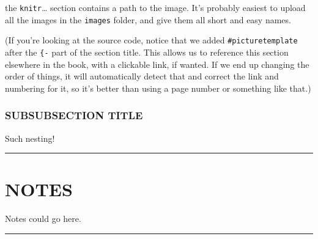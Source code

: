 \documentclass[
]{book}
\begin{document}
the \texttt{knitr}\ldots{} section contains a path to the image.
It's probably easiest to upload all the images in the \texttt{images} folder,
and give them all short and easy names.

(If you're looking at the source code, notice that we added \texttt{\#picturetemplate} after the \texttt{\{-} part of the section title.
This allows us to reference this section elsewhere in the book, with a clickable link, if wanted.
If we end up changing the order of things, it will automatically detect that and correct the link and numbering for it,
so it's better than using a page number or something like that.)

\hypertarget{subsubsection-title}{%
\subsection*{SUBSUBSECTION TITLE}\label{subsubsection-title}}


Such nesting!

\begin{center}\rule{0.5\linewidth}{0.5pt}\end{center}

\hypertarget{notes}{%
\chapter*{NOTES}\label{notes}}


Notes could go here.

\begin{center}\rule{0.5\linewidth}{0.5pt}\end{center}
\end{document}
